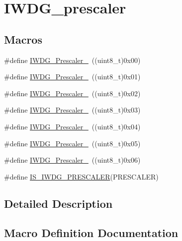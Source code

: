 \hypertarget{group___i_w_d_g__prescaler}{}\section{I\+W\+D\+G\+\_\+prescaler}
\label{group___i_w_d_g__prescaler}
\subsection*{Macros}
\begin{DoxyCompactItemize}
\item 
\#define \mbox{\hyperlink{group___i_w_d_g__prescaler_ga82a058c196d5a9cd7ea2f2202b394ba0}{I\+W\+D\+G\+\_\+\+Prescaler\+\_}}~((uint8\+\_\+t)0x00)
\item 
\#define \mbox{\hyperlink{group___i_w_d_g__prescaler_ga59763b9a127c67adf5d11474188996a1}{I\+W\+D\+G\+\_\+\+Prescaler\+\_}}~((uint8\+\_\+t)0x01)
\item 
\#define \mbox{\hyperlink{group___i_w_d_g__prescaler_gafa81d30511ff5ec74bb38ed71f5bb66e}{I\+W\+D\+G\+\_\+\+Prescaler\+\_}}~((uint8\+\_\+t)0x02)
\item 
\#define \mbox{\hyperlink{group___i_w_d_g__prescaler_gaa8b091b6e4102513b1e3a1c4eb6756ba}{I\+W\+D\+G\+\_\+\+Prescaler\+\_}}~((uint8\+\_\+t)0x03)
\item 
\#define \mbox{\hyperlink{group___i_w_d_g__prescaler_ga7ea813c73ae0acb40acb60e7d3956910}{I\+W\+D\+G\+\_\+\+Prescaler\+\_}}~((uint8\+\_\+t)0x04)
\item 
\#define \mbox{\hyperlink{group___i_w_d_g__prescaler_gaea6bf96c2fd5a6f3b9574e7898096641}{I\+W\+D\+G\+\_\+\+Prescaler\+\_}}~((uint8\+\_\+t)0x05)
\item 
\#define \mbox{\hyperlink{group___i_w_d_g__prescaler_ga7d6e918748185639049644c970db2b43}{I\+W\+D\+G\+\_\+\+Prescaler\+\_}}~((uint8\+\_\+t)0x06)
\item 
\#define \mbox{\hyperlink{group___i_w_d_g__prescaler_gab1e0695c1a22840d5be7c7fad283f4ba}{I\+S\+\_\+\+I\+W\+D\+G\+\_\+\+P\+R\+E\+S\+C\+A\+L\+ER}}(P\+R\+E\+S\+C\+A\+L\+ER)
\end{DoxyCompactItemize}


\subsection{Detailed Description}


\subsection{Macro Definition Documentation}
\mbox{\label{group___i_w_d_g__prescaler_gab1e0695c1a22840d5be7c7fad283f4ba}} 
